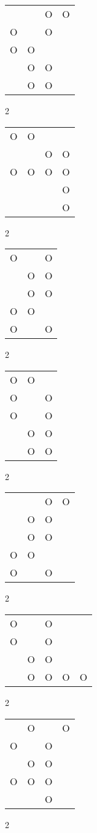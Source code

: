 \begin{tabular}{|m{0.2cm}m{0.2cm}m{0.2cm}m{0.2cm}|}\hline
 & &O&O\\
O& &O& \\
O&O& & \\
 &O&O& \\
 &O&O& \\
\hline\end{tabular}2
\begin{tabular}{|m{0.2cm}m{0.2cm}m{0.2cm}m{0.2cm}|}\hline
O&O& & \\
 & &O&O\\
O&O&O&O\\
 & & &O\\
 & & &O\\
\hline\end{tabular}2
\begin{tabular}{|m{0.2cm}m{0.2cm}m{0.2cm}|}\hline
O& &O\\
 &O&O\\
 &O&O\\
O&O& \\
O& &O\\
\hline\end{tabular}2
\begin{tabular}{|m{0.2cm}m{0.2cm}m{0.2cm}|}\hline
O&O& \\
O& &O\\
O& &O\\
 &O&O\\
 &O&O\\
\hline\end{tabular}2
\begin{tabular}{|m{0.2cm}m{0.2cm}m{0.2cm}m{0.2cm}|}\hline
 & &O&O\\
 &O&O& \\
 &O&O& \\
O&O& & \\
O& &O& \\
\hline\end{tabular}2
\begin{tabular}{|m{0.2cm}m{0.2cm}m{0.2cm}m{0.2cm}m{0.2cm}|}\hline
O& &O& & \\
O& &O& & \\
 &O&O& & \\
 &O&O&O&O\\
\hline\end{tabular}2
\begin{tabular}{|m{0.2cm}m{0.2cm}m{0.2cm}m{0.2cm}|}\hline
 &O& &O\\
O& &O& \\
 &O&O& \\
O&O&O& \\
 & &O& \\
\hline\end{tabular}2
